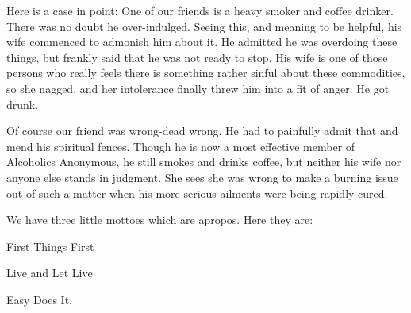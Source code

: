\begin{biblechapter}
Here is a case in point:  One of our friends is a heavy smoker and coffee drinker.  There was no doubt he over-indulged.  Seeing this, and meaning to be helpful, his wife commenced to admonish him about it.  He admitted he was overdoing these things, but frankly said that he was not ready to stop.  His wife is one of those persons who really feels there is something rather sinful about these commodities, so she nagged, and her intolerance finally threw him into a fit of anger.  He got drunk.

Of course our friend was wrong-dead wrong.  He had to painfully admit that and mend his spiritual fences.  Though he is now a most effective member of Alcoholics Anonymous, he still smokes and drinks coffee, but neither his wife nor anyone else stands in judgment.  She sees she was wrong to make a burning issue out of such a matter when his more serious ailments were being rapidly cured.

We have three little mottoes which are apropos.  Here they are:

First Things First

Live and Let Live

Easy Does It.

\end{biblechapter}
